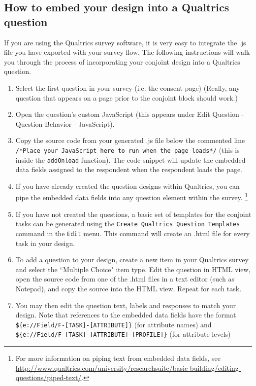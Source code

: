 \documentclass[12pt]{article}
\begin{document}
\subsection{How to embed your design into a Qualtrics question}

If you are using the Qualtrics survey software, it is very easy to integrate the .js file you have exported with your survey flow. The following instructions will walk you through the process of incorporating your conjoint design into a Qualtrics question.
\begin{enumerate}
\item Select the first question in your survey (i.e. the consent page) (Really, any question that appears on a page prior to the conjoint block should work.)
\item Open the question's custom JavaScript (this appears under Edit Question - Question Behavior - JavaScript).
\item Copy the source code from your generated .js file below the commented line \texttt{/*Place your JavaScript here to run when the page loads*/} (this is inside the  \texttt{addOnload} function). The code snippet will update the embedded data fields assigned to the respondent when the respondent loads the page.
\item If you have already created the question designs within Qualtrics, you can pipe the embedded data fields into any question element within the survey. \footnote{For more information on piping text from embedded data fields, see \href{http://www.qualtrics.com/university/researchsuite/basic-building/editing-questions/piped-text/}{http://www.qualtrics.com/university/researchsuite/basic-building/editing-questions/piped-text/}.} 
\item If you have not created the questions, a basic set of templates for the conjoint tasks can be generated using the \texttt{Create Qualtrics Question Templates} command in the \texttt{Edit} menu. This command will create an .html file for every task in your design.
\item To add a question to your design, create a new item in your Qualtrics survey and select the ``Multiple Choice" item type. Edit the question in HTML view, open the source code from one of the .html files in a text editor (such as Notepad), and copy the source into the HTML view. Repeat for each task.
\item You may then edit the question text, labels and responses to match your design. Note that references to the embedded data fields have the format \texttt{\$\{e://Field/F-[TASK]-[ATTRIBUTE]\}} (for attribute names) and \texttt{\$\{e://Field/F-[TASK]-[ATTRIBUTE]-[PROFILE]\}} (for attribute levels)
\end{enumerate}
\end{document}
